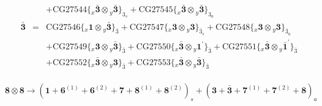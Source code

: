 \documentclass[english]{article}
\newcommand{\rep}[1]{\mathbf{#1}}
\newcommand{\repx}[2]{{}_{#2}\mathbf{#1}}
\newcommand{\subcg}[3]{\big\{ \repx{#1}{x}\otimes\repx{#2}{y}\big\}^{}_{#3}}
\begin{document}
\begin{itemize}
\begin{eqnarray*}
 & & +\text{CG27544}\subcg{\bar{3}}{\bar{3}}{3_{s}}+\text{CG27545}\subcg{\bar{3}}{\bar{3}}{3_{a}}
\\
\rep{\bar{3}} &=& \text{CG27546}\subcg{1}{\bar{3}}{\bar{3}}+\text{CG27547}\subcg{3}{3}{\bar{3}_{s}}+\text{CG27548}\subcg{3}{3}{\bar{3}_{a}} \\ 
 & & +\text{CG27549}\subcg{3}{\bar{3}}{\bar{3}}+\text{CG27550}\subcg{\bar{3}}{1^{\prime}}{\bar{3}}+\text{CG27551}\subcg{\bar{3}}{\bar{1}^{\prime}}{\bar{3}} \\ 
 & & +\text{CG27552}\subcg{\bar{3}}{3}{\bar{3}}+\text{CG27553}\subcg{\bar{3}}{\bar{3}}{\bar{3}}
\end{eqnarray*}
\end{itemize}
\paragraph*{\Large $\rep{8}\otimes\rep{8}\to\left(\rep{1}+\rep{6}^{(1)}+\rep{6}^{(2)}+\rep{7}+\rep{8}^{(1)}+\rep{8}^{(2)}\right)_s+\left(\rep{3}+\rep{\bar{3}}+\rep{7}^{(1)}+\rep{7}^{(2)}+\rep{8}\right)_a$}
\end{document}
